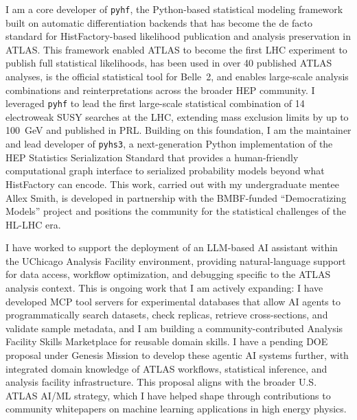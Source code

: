 \documentclass[10pt,letterpaper,sans]{moderncv} %
\begin{document}
I am a core developer of \texttt{pyhf}, the Python-based statistical modeling framework built on automatic differentiation backends that has become the de facto standard for HistFactory-based likelihood publication and analysis preservation in ATLAS. This framework enabled ATLAS to become the first LHC experiment to publish full statistical likelihoods, has been used in over 40 published ATLAS analyses, is the official statistical tool for Belle~2, and enables large-scale analysis combinations and reinterpretations across the broader HEP community. I leveraged \texttt{pyhf} to lead the first large-scale statistical combination of 14 electroweak SUSY searches at the LHC, extending mass exclusion limits by up to 100~GeV and published in PRL. Building on this foundation, I am the maintainer and lead developer of \texttt{pyhs3}, a next-generation Python implementation of the HEP Statistics Serialization Standard that provides a human-friendly computational graph interface to serialized probability models beyond what HistFactory can encode. This work, carried out with my undergraduate mentee Allex Smith, is developed in partnership with the BMBF-funded ``Democratizing Models'' project and positions the community for the statistical challenges of the HL-LHC era.

I have worked to support the deployment of an LLM-based AI assistant within the UChicago Analysis Facility environment, providing natural-language support for data access, workflow optimization, and debugging specific to the ATLAS analysis context. This is ongoing work that I am actively expanding: I have developed MCP tool servers for experimental databases that allow AI agents to programmatically search datasets, check replicas, retrieve cross-sections, and validate sample metadata, and I am building a community-contributed Analysis Facility Skills Marketplace for reusable domain skills. I have a pending DOE proposal under Genesis Mission to develop these agentic AI systems further, with integrated domain knowledge of ATLAS workflows, statistical inference, and analysis facility infrastructure. This proposal aligns with the broader U.S. ATLAS AI/ML strategy, which I have helped shape through contributions to community whitepapers on machine learning applications in high energy physics.
\end{document}
